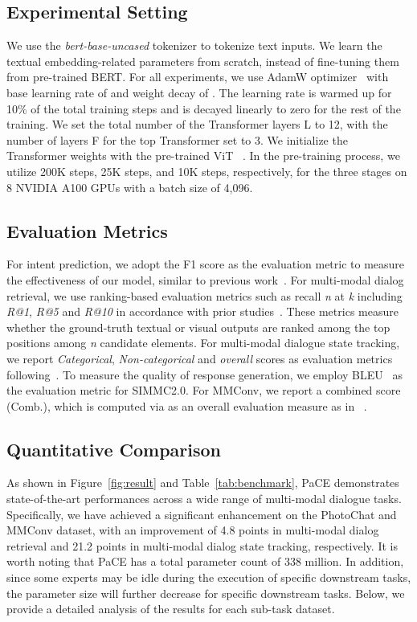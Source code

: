\documentclass[11pt]{article}
\begin{document}
\subsection{Experimental Setting}
We use the \textit{bert-base-uncased} tokenizer to tokenize text inputs. We learn the textual embedding-related parameters from scratch, instead of fine-tuning them from pre-trained BERT.
For all experiments, we use AdamW optimizer~\citep{loshchilov2017decoupled} with base learning rate of  and weight decay of . The learning rate is warmed up for 10\% of the total training steps and is decayed linearly to zero for the rest of the training. We set the total number of the Transformer layers L to 12, with the number of layers F for the top Transformer set to 3.
We initialize the Transformer weights with the pre-trained ViT ~\citep{dosovitskiy2020image}. 
In the pre-training process, we utilize 200K steps, 25K steps, and 10K steps, respectively, for the three stages on 8 NVIDIA A100 GPUs with a batch size of 4,096.


\subsection{Evaluation Metrics}
 For intent prediction, we adopt the F1 score as the evaluation metric to measure the effectiveness of our model, similar to previous work~\cite{zang2021photochat}. For multi-modal dialog retrieval, we use ranking-based evaluation metrics such as recall \textit{n} at \textit{k} including \textit{R@1}, \textit{R@5} and \textit{R@10} in accordance with prior studies~\citep{zang2021photochat, shuster2018image}. These metrics measure whether the ground-truth textual or visual outputs are ranked among the top  positions among \textit{n} candidate elements. For multi-modal dialogue state tracking, we report \textit{Categorical}, \textit{Non-categorical} and \textit{overall} scores as evaluation metrics following~\cite{liao2021mmconv}. To measure the quality of response generation, we employ BLEU~\cite {papineni2002bleu} as the evaluation metric for SIMMC2.0. For MMConv, we report a combined score (Comb.), which is computed via  as an overall evaluation measure as in ~\cite{mehri2019structured}. 




\subsection{Quantitative Comparison}
As shown in Figure~\ref{fig:result} and Table~\ref{tab:benchmark}, PaCE  demonstrates state-of-the-art performances across a wide range of multi-modal dialogue tasks. Specifically, we have achieved a significant enhancement on the PhotoChat and MMConv dataset, with an improvement of 4.8 points in multi-modal dialog retrieval and 21.2 points in multi-modal dialog state tracking, respectively. It is worth noting that PaCE has a total parameter count of 338 million. In addition, since some experts may be idle during the execution of specific downstream tasks, the parameter size will further decrease for specific downstream tasks. Below, we provide a detailed analysis of the results for each sub-task dataset.
\end{document}

